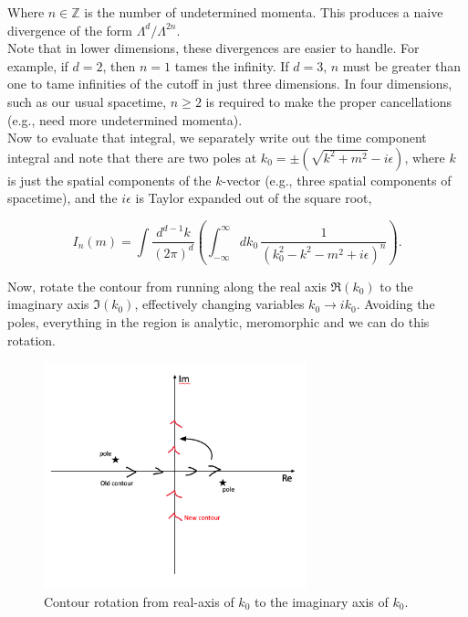 \noindent Where $n \in \mathbb{Z}$ is the number of undetermined momenta. This produces a naive divergence of the form $\Lambda^d / \Lambda^{2n}$. \\

\noindent Note that in lower dimensions, these divergences are easier to handle. For example, if $d=2$, then $n=1$ tames the infinity. If $d=3$, $n$ must be greater than one to tame infinities of the cutoff in just three dimensions. In four dimensions, such as our usual spacetime, $n \ge 2$ is required to make the proper cancellations (e.g., need more undetermined momenta). \\

\noindent Now to evaluate that integral, we separately write out the time component integral and note that there are two poles at $k_0 = \pm( \sqrt{k^2 + m^2} -i \epsilon)$, where $k$ is just the spatial components of the $k$-vector (e.g., three spatial components of spacetime), and the $i\epsilon$ is Taylor expanded out of the square root,

\begin{equation}
I_n (m) = \int \frac{d^{d-1} k}{(2 \pi)^d} \left( \int_{-\infty}^\infty dk_0 \, \frac{1}{(k_0^2 - k^2 - m^2 + i \epsilon)^n} \right).
\end{equation}

\noindent Now, rotate the contour from running along the real axis $\Re (k_0)$ to the imaginary axis $\Im (k_0)$, effectively changing variables $k_0 \rightarrow i k_0$. Avoiding the poles, everything in the region is analytic, meromorphic and we can do this rotation.  \\

\begin{figure}[H]
	\centering
	\includegraphics[width=3in]{images/contour.png}
	\caption*{Contour rotation from real-axis of $k_0$ to the imaginary axis of $k_0$.}
\end{figure}

